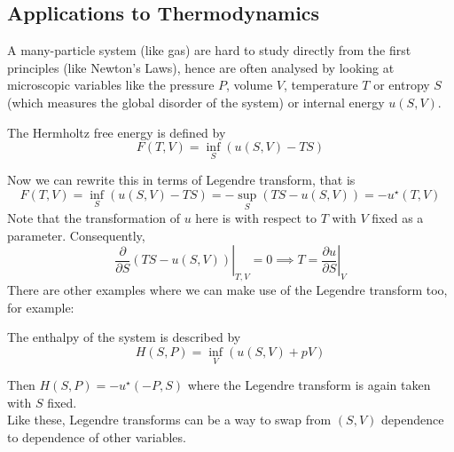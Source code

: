 \subsection{Applications to Thermodynamics}
A many-particle system (like gas) are hard to study directly from the first principles (like Newton's Laws), hence are often analysed by looking at microscopic variables like the pressure $P$, volume $V$, temperature $T$ or entropy $S$ (which measures the global disorder of the system) or internal energy $u(S,V)$.
\begin{definition}
    The Hermholtz free energy is defined by
    $$F(T,V)=\inf_{S}(u(S,V)-TS)$$
\end{definition}
Now we can rewrite this in terms of Legendre transform, that is
$$F(T,V)=\inf_{S}(u(S,V)-TS)=-\sup_{S}(TS-u(S,V))=-u^\star(T,V)$$
Note that the transformation of $u$ here is with respect to $T$ with $V$ fixed as a parameter.
Consequently,
$$\left.\frac{\partial}{\partial S}(TS-u(S,V))\right|_{T,V}=0\implies T=\left.\frac{\partial u}{\partial S}\right|_V$$
There are other examples where we can make use of the Legendre transform too, for example:
\begin{definition}
    The enthalpy of the system is described by
    $$H(S,P)=\inf_{V}(u(S,V)+pV)$$
\end{definition}
Then $H(S,P)=-u^\star(-P,S)$ where the Legendre transform is again taken with $S$ fixed.\\
Like these, Legendre transforms can be a way to swap from $(S,V)$ dependence to dependence of other variables.